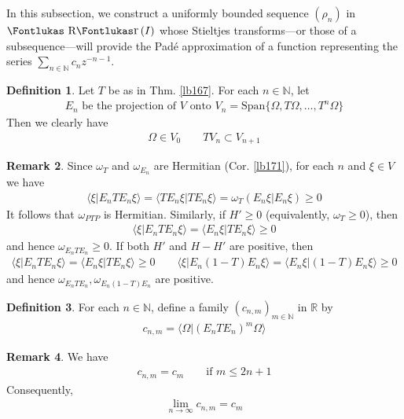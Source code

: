 \documentclass[12pt,b5paper,notitlepage]{article}
\theoremstyle{definition}
\newtheorem{df}{Definition}[subsection]
\newtheorem{rem}[df]{Remark}
\theoremstyle{plain}
\DeclareMathOperator{\Rr}{\text{\Fontlukas R}\text{\kern -0pt {\Fontlukas\large r}}\,}
\newcommand{\Span}{\mathrm{Span}}
\newcommand{\bk}[1]{\langle {#1}\rangle}
\newcommand{\Nbb}{\mathbb N}
\newcommand{\Rbb}{\mathbb R}
\numberwithin{equation}{section}
\begin{document}
In this subsection, we construct a uniformly bounded sequence $(\rho_n)$ in $\Rr (I)$ whose Stieltjes transforms---or those of a subsequence---will provide the Pad\'e approximation of a function representing the series $\sum_{n\in\Nbb}c_nz^{-n-1}$.

\begin{df}\label{lb189}
Let $T$ be as in Thm. \ref{lb167}. For each $n\in\Nbb$, let
\begin{align*}
E_n\text{ be the projection of $V$ onto }V_n=\Span\{\Omega,T\Omega,\dots,T^n\Omega\}
\end{align*}
Then we clearly have
\begin{align}\label{eq84}
\Omega\in V_0\qquad TV_n\subset V_{n+1}
\end{align}
\end{df}



\begin{rem}\label{lb173}
Since $\omega_T$ and $\omega_{E_n}$ are Hermitian (Cor. \ref{lb171}), for each $n$ and $\xi\in V$ we have
\begin{align*}
\bk{\xi|E_nTE_n\xi}=\bk{TE_n\xi|TE_n\xi}=\omega_T(E_n\xi|E_n\xi)\geq0
\end{align*}
It follows that $\omega_{PTP}$ is Hermitian. Similarly, if $H'\geq0$ (equivalently, $\omega_T\geq0$), then
\begin{align*}
\bk{\xi|E_nTE_n\xi}=\bk{E_n\xi|TE_n\xi}\geq0
\end{align*}
and hence $\omega_{E_nTE_n}\geq0$. If both $H'$ and $H-H'$ are positive, then 
\begin{align*}
\bk{\xi|E_nTE_n\xi}=\bk{E_n\xi|TE_n\xi}\geq0\qquad\bk{\xi|E_n(1-T)E_n\xi}=\bk{E_n\xi|(1-T)E_n\xi}\geq0
\end{align*}
and hence $\omega_{E_nTE_n},\omega_{E_n(1-T)E_n}$ are positive.
\end{rem}


\begin{df}
For each $n\in\Nbb$, define a family $(c_{n,m})_{m\in\Nbb}$ in $\Rbb$ by
\begin{align}
c_{n,m}=\bk{\Omega|(E_nTE_n)^m\Omega}
\end{align}
\end{df}

\begin{rem}\label{lb185}
We have
\begin{align}\label{eq83}
c_{n,m}=c_m\qquad\text{if }m\leq 2n+1
\end{align}
Consequently,
\begin{align}\label{eq90}
\lim_{n\rightarrow\infty}c_{n,m}=c_m
\end{align}
\end{rem}
\end{document}
